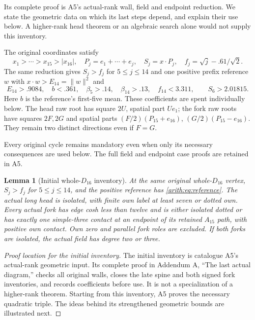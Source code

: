 \documentclass[11pt]{article}
\newtheorem{lemma}[theorem]{Lemma}
\theoremstyle{remark}\newtheorem{remark}[theorem]{Remark}
\numberwithin{equation}{section}
\newcommand{\norm}[1]{\lVert #1\rVert}
\begin{document}
Its complete proof is A5's actual-rank wall, field and endpoint reduction.
We state the geometric data on which its last steps depend, and explain
their use below. A higher-rank head theorem or an algebraic search alone
would not supply this inventory.

The original coordinates satisfy
 \[
 x_1>\cdots>x_{15}>|x_{16}|,\quad P_j=e_1+\cdots+e_j,\quad
 S_j=x\cdot P_j,\quad f_j=\sqrt j-.61/\sqrt2.
\]
The same reduction gives $S_j>f_j$ for $5\le j\le14$ and one positive prefix
reference $w$ with $x\cdot w>E_{14}=\norm{w}^2$ and
 \begin{equation}\label{arith:eq:reference}
 E_{14}>.9084,\quad b<.361,\quad
 \beta_5>.14,\quad\beta_{14}>.13,\quad f_{14}<3.311,
 \qquad S_6>2.01815.
\end{equation}
Here $b$ is the reference's first-five mean. These coefficients are spent
individually below. The head raw root has square $2U$, spatial
part $Ue_1$; the fork raw roots have squares $2F,2G$ and spatial
parts $(F/2)(P_{15}+e_{16})$, $(G/2)(P_{15}-e_{16})$.
They remain two distinct directions even if $F=G$.

Every original cycle remains mandatory even when only its necessary
consequences are used below. The full field and endpoint case proofs
are retained in A5.

\begin{lemma}[Initial whole-$D_{16}$ inventory]\label{arith:lem:D16initial}
At the same original whole-$D_{16}$ vertex, $S_j>f_j$ for $5\le j\le14$,
and the positive reference has
\eqref{arith:eq:reference}. The actual long head is isolated, with finite
own label at least seven or dotted own. Every actual fork has edge
cosh less than twelve and is either isolated dotted or has exactly
one simple-three contact at an endpoint of its retained $A_{15}$ path,
with positive own contact. Own zero and parallel fork roles are excluded.
If both forks are isolated, the actual field has degree two or three.
\end{lemma}


\begin{proof}[Proof location for the initial inventory]
The initial inventory is catalogue A5's actual-rank geometric input.
Its complete proof in Addendum A, ``The last actual diagram,'' checks
all original walls, closes the late spine and both signed fork inventories,
and records coefficients before use. It is not a specialization of a
higher-rank theorem. Starting from this inventory, A5 proves the necessary quadratic triple.
The ideas behind its strengthened geometric bounds are illustrated next.
\end{proof}
\end{document}
